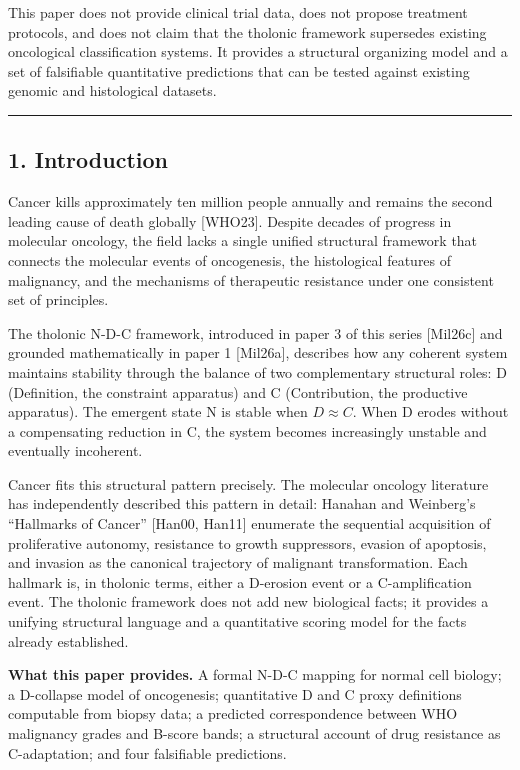 \documentclass[
  11pt,
  letterpaper,
]{article}
\begin{document}
This paper does not provide clinical trial data, does not propose
treatment protocols, and does not claim that the tholonic framework
supersedes existing oncological classification systems. It provides a
structural organizing model and a set of falsifiable quantitative
predictions that can be tested against existing genomic and histological
datasets.

\begin{center}\rule{0.5\linewidth}{0.5pt}\end{center}

\subsection{1. Introduction}\label{introduction}

Cancer kills approximately ten million people annually and remains the
second leading cause of death globally {[}WHO23{]}. Despite decades of
progress in molecular oncology, the field lacks a single unified
structural framework that connects the molecular events of oncogenesis,
the histological features of malignancy, and the mechanisms of
therapeutic resistance under one consistent set of principles.

The tholonic N-D-C framework, introduced in paper 3 of this series
{[}Mil26c{]} and grounded mathematically in paper 1 {[}Mil26a{]},
describes how any coherent system maintains stability through the
balance of two complementary structural roles: D (Definition, the
constraint apparatus) and C (Contribution, the productive apparatus).
The emergent state N is stable when \(D \approx C\). When D erodes
without a compensating reduction in C, the system becomes increasingly
unstable and eventually incoherent.

Cancer fits this structural pattern precisely. The molecular oncology
literature has independently described this pattern in detail: Hanahan
and Weinberg's ``Hallmarks of Cancer'' {[}Han00, Han11{]} enumerate the
sequential acquisition of proliferative autonomy, resistance to growth
suppressors, evasion of apoptosis, and invasion as the canonical
trajectory of malignant transformation. Each hallmark is, in tholonic
terms, either a D-erosion event or a C-amplification event. The tholonic
framework does not add new biological facts; it provides a unifying
structural language and a quantitative scoring model for the facts
already established.

\textbf{What this paper provides.} A formal N-D-C mapping for normal
cell biology; a D-collapse model of oncogenesis; quantitative D and C
proxy definitions computable from biopsy data; a predicted
correspondence between WHO malignancy grades and B-score bands; a
structural account of drug resistance as C-adaptation; and four
falsifiable predictions.
\end{document}
